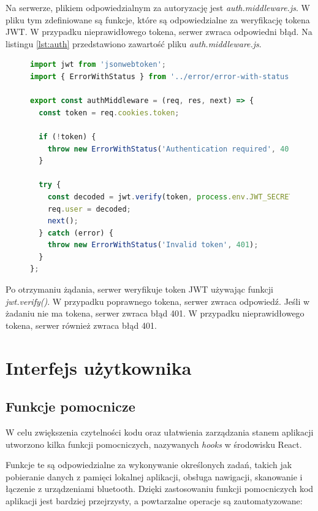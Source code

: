 Na serwerze, plikiem odpowiedzialnym za autoryzację jest \textit{auth.middleware.js}. W pliku tym zdefiniowane są funkcje, które są odpowiedzialne za weryfikację tokena JWT. W przypadku nieprawidłowego tokena, serwer zwraca odpowiedni błąd. Na listingu \ref{lst:auth} przedstawiono zawartość pliku \textit{auth.middleware.js}.

\begin{figure}[H]
\begin{lstlisting}[language=JavaScript, caption=Przykładowa definicja autoryzacji, label=lst:auth]
import jwt from 'jsonwebtoken';
import { ErrorWithStatus } from '../error/error-with-status.js';

export const authMiddleware = (req, res, next) => {
  const token = req.cookies.token;

  if (!token) {
    throw new ErrorWithStatus('Authentication required', 401);
  }

  try {
    const decoded = jwt.verify(token, process.env.JWT_SECRET);
    req.user = decoded;
    next();
  } catch (error) {
    throw new ErrorWithStatus('Invalid token', 401);
  }
};
\end{lstlisting}
\end{figure}

Po otrzymaniu żądania, serwer weryfikuje token JWT używając funkcji \textit{jwt.verify()}. W przypadku poprawnego tokena, serwer zwraca odpowiedź. Jeśli w żadaniu nie ma tokena, serwer zwraca błąd 401. W przypadku nieprawidłowego tokena, serwer również zwraca błąd 401.

\section{Interfejs użytkownika}

\subsection{Funkcje pomocnicze} 

W celu zwiększenia czytelności kodu oraz ułatwienia zarządzania stanem aplikacji utworzono kilka funkcji pomocniczych, nazywanych \textit{hooks} w środowisku React. 

Funkcje te są odpowiedzialne za wykonywanie określonych zadań, takich jak pobieranie danych z pamięci lokalnej aplikacji, obsługa nawigacji, skanowanie i łączenie z urządzeniami bluetooth. Dzięki zastosowaniu funkcji pomocniczych kod aplikacji jest bardziej przejrzysty, a powtarzalne operacje są zautomatyzowane:

